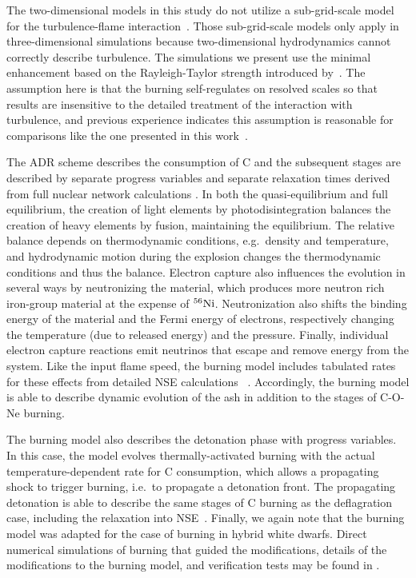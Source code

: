 \documentclass[iop,apj]{emulateapj}
\newcommand{\Ni}[1]{\ensuremath{{}^{#1}{\rm Ni}}}
\begin{document}
The two-dimensional models in this study do not utilize a sub-grid-scale
model for the turbulence-flame
interaction~\citep[See][for examples]{Schmetal06a,Schmetal06b,jacketal2014}.
Those sub-grid-scale models only apply in three-dimensional
simulations because two-dimensional hydrodynamics cannot
correctly describe turbulence. The simulations we present
use the minimal enhancement based on the Rayleigh-Taylor
strength introduced by~\citet{townsley.calder.ea:flame}. The
assumption here is that the burning self-regulates on resolved
scales so that results are insensitive to the detailed treatment
of the interaction with turbulence, and previous experience
indicates this assumption is reasonable for comparisons
like the one presented in this work~\citep{townsley.calder.ea:flame,
willcoxetal2016}.

The ADR scheme describes the consumption of C and the subsequent stages
are described by separate progress variables and
separate relaxation times derived from full nuclear network calculations
\cite{Caldetal07,townetal2016}. In both the quasi-equilibrium and full equilibrium,
the creation of light elements by photodisintegration balances the creation of heavy
elements by fusion, maintaining the equilibrium. The relative balance depends on
thermodynamic conditions, e.g.\ density and temperature, and hydrodynamic motion
during the explosion changes the thermodynamic conditions and thus the
balance.
{\color{blue} Electron capture also influences the evolution in several ways by
neutronizing the material, which produces more neutron rich iron-group
material at the expense of \Ni{56}. Neutronization also shifts the binding
energy of the material and the Fermi energy of electrons, respectively
changing the temperature (due to released energy) and the pressure.
Finally, individual electron capture reactions emit neutrinos that
escape and remove energy from the system.}
Like the input flame speed, the burning model includes tabulated rates for these effects
from detailed NSE calculations ~\citep{SeitTownetal09}. Accordingly, the burning
model is able to describe dynamic evolution of the ash in addition to the
stages of C-O-Ne burning.

The burning model also describes the detonation phase with progress variables.
In this case, the model evolves thermally-activated burning with the actual
temperature-dependent rate for C consumption, which allows a propagating shock to
trigger burning, i.e.\ to propagate a detonation front. The propagating detonation
is able to describe the same stages of C burning as the deflagration case, including
the relaxation into NSE~\cite[and references therein]{townetal2016}. Finally,
we again note that the burning model was adapted for the case of burning in
hybrid white dwarfs. Direct numerical simulations of burning that guided
the modifications, details of the modifications to the burning model, and
verification tests may be found in \citet{willcoxetal2016}.
\end{document}
